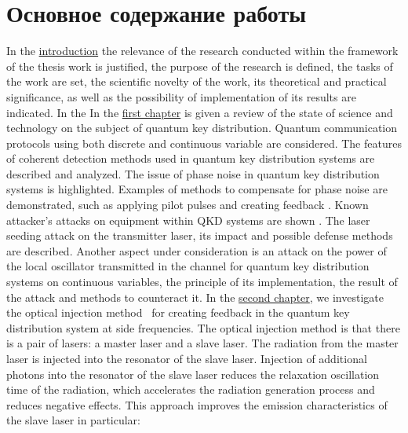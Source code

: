 \section*{Основное содержание работы }
In the \underline{introduction} the relevance of the research conducted within the framework of the thesis work is justified, the purpose of the research is defined, the tasks of the work are set, the scientific novelty of the work, its theoretical and practical significance, as well as the possibility of implementation of its results are indicated. 
In the \newline In the \underline{first chapter} is given a review of the state of science and technology on the subject of quantum key distribution. Quantum communication protocols using both discrete\cite{bennett1984,bennett1992,ekert1991,wang2005b} and continuous variable\cite{yuan2005,andersen2010,dixon2010,hajomer2024,diamanti2015} are considered. The features of coherent detection methods\cite{ip2008a} used in quantum key distribution systems are described and analyzed. The issue of phase noise in quantum key distribution systems is highlighted. Examples of methods to compensate for phase noise are demonstrated, such as applying pilot pulses \cite{wang2020} and creating feedback \cite{khaksar2023a}.  Known attacker's attacks on equipment within QKD systems are shown \cite{lydersen2010a,gisin2006, huang2013}. The laser seeding attack on the transmitter laser, its impact and possible defense methods are described{\cite{huang2019,lovic2023,ma2013}. Another aspect under consideration is an attack on the power of the local oscillator transmitted in the channel for quantum key distribution systems on continuous variables, the principle of its implementation, the result of the attack and methods to counteract it\cite{jouguet2013,shao2022,fan2023,ren2019}.
\newline In the \underline{second chapter}, we investigate the optical injection method~\cite{shakhovoy2024,liu2020} for creating feedback in the quantum key distribution system at side frequencies\cite{gleim2016,gleim2017,fadeev2024}. The optical injection method is that there is a pair of lasers: a master laser and a slave laser. The radiation from the master laser is injected into the resonator of the slave laser. Injection of additional photons into the resonator of the slave laser reduces the relaxation oscillation time of the radiation, which accelerates the radiation generation process and reduces negative effects. This approach improves the emission characteristics of the slave laser in particular:
}
